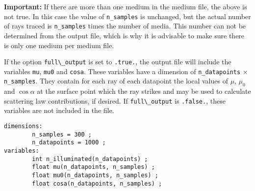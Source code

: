 \documentclass[a4paper]{article}
\newcommand{\code}[1]{\lstinline{#1}}
\begin{document}
\textbf{Important:} If there are more than one medium in the medium file, the above is not true. In this case the value of \code{n_samples} is unchanged, but the actual number of rays traced is \code{n_samples} times the number of media. This number can not be determined from the output file, which is why it is advisable to make sure there is only one medium per medium file.

If the option \code{full\_output} is set to \code{.true.}, the output file will include the variables \code{mu}, \code{mu0} and \code{cosa}. These variables have a dimension of \code{n_datapoints} $\times$ \code{n_samples}. They contain for each ray of each datapoint the local values of $\mu$, $\mu_0$ and $\cos \alpha$ at the surface point which the ray strikes and may be used to calculate scattering law contributions, if desired. If \code{full\_output} is \code{.false.}, these variables are not included in the file.

\begin{lstlisting}[float, frame=trbl, caption="Output file header", label=outputlst]
dimensions:
        n_samples = 300 ;
        n_datapoints = 1000 ;
variables:
        int n_illuminated(n_datapoints) ;
        float mu(n_datapoints, n_samples) ;
        float mu0(n_datapoints, n_samples) ;
        float cosa(n_datapoints, n_samples) ;
\end{lstlisting}
\end{document}
